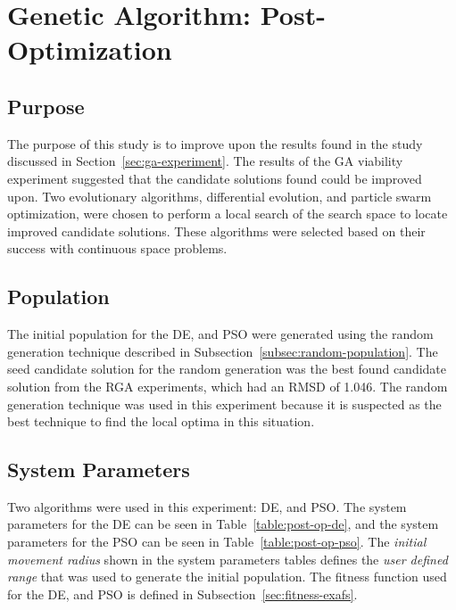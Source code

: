 \section{Genetic Algorithm: Post-Optimization}
\label{sec:ga-post-op}

\subsection{Purpose}

The purpose of this study is to improve upon the results found in the study discussed in Section~\ref{sec:ga-experiment}. The results of the GA viability experiment suggested that the candidate solutions found could be improved upon. Two evolutionary algorithms, differential evolution, and particle swarm optimization, were chosen to perform a local search of the search space to locate improved candidate solutions. These algorithms were selected based on their success with continuous space problems.

\subsection{Population}

The initial population for the DE, and PSO were generated using the random generation technique described in Subsection~\ref{subsec:random-population}. The seed candidate solution for the random generation was the best found candidate solution from the RGA experiments, which had an RMSD of 1.046. The random generation technique was used in this experiment because it is suspected as the best technique to find the local optima in this situation.


\subsection{System Parameters}

Two algorithms were used in this experiment: DE, and PSO. The system parameters for the DE can be seen in Table~\ref{table:post-op-de}, and the system parameters for the PSO can be seen in Table~\ref{table:post-op-pso}. The \textit{initial movement radius} shown in the system parameters tables defines the \textit{user defined range} that was used to generate the initial population. The fitness function used for the DE, and PSO is defined in Subsection~\ref{sec:fitness-exafs}.

